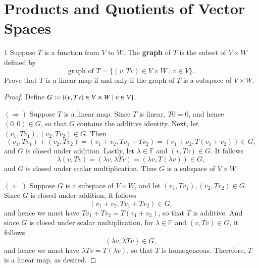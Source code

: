 \documentclass[11pt]{extarticle}
\newenvironment{problem}[1]{\begin{prob*}{#1}{}}{\end{prob*}}
\newcommand{\F}{\mathbb{F}}
\newcommand{\defeq}{\vcentcolon=}
\begin{document}
\section{Products and Quotients of Vector Spaces}

\begin{problem}{1}
Suppose $T$ is a function from $V$ to $W$.  The \textbf{graph} of $T$ is the subset of $V\times W$ defined by
\begin{equation*}
\text{graph of }T=\{(v,Tv)\in V\times W\mid v\in V\}. 
\end{equation*}
Prove that $T$ is a linear map if and only if the graph of $T$ is a subspace of $V\times W$.  
\end{problem}
\begin{proof}
Define $G \defeq \{(v, Tv)\in V\times W \mid v\in V\}$.
\par $(\Rightarrow)$ Suppose $T$ is a linear map.  Since $T$ is linear, $T0 =0$, and hence $(0, 0)\in G$, so that $G$ contains the additive identity.  Next, let $(v_1, Tv_1),(v_2,Tv_2)\in G$.  Then
\begin{equation*}
(v_1, Tv_1) + (v_2,Tv_2) = (v_1 + v_2, Tv_1 + Tv_2) = (v_1 + v_2, T(v_1 + v_2))\in G,
\end{equation*} 
and $G$ is closed under addition.  Lastly, let $\lambda\in\F$ and $(v, Tv)\in G$.  It follows
\begin{equation*}
\lambda(v, Tv) = (\lambda v, \lambda Tv) = (\lambda v, T(\lambda v))\in G,
\end{equation*}
and $G$ is closed under scalar multiplication.  Thus $G$ is a subspace of $V\times W$.  
\par $(\Leftarrow)$ Suppose $G$ is a subspace of $V\times W$, and let $(v_1, Tv_1),(v_2, Tv_2)\in G$.  Since $G$ is closed under addition, it follows
\begin{equation*}
(v_1 + v_2, Tv_1 + Tv_2)\in G,
\end{equation*}
and hence we must have $Tv_1 + Tv_2 = T(v_1 + v_2)$, so that $T$ is additive.  And since $G$ is closed under scalar multiplication, for $\lambda\in \F$ and $(v, Tv)\in G$, it follows
\begin{equation*}
(\lambda v, \lambda Tv)\in G,
\end{equation*}
and hence we must have $\lambda Tv = T(\lambda v)$, so that $T$ is homogeneous.  Therefore, $T$ is a linear map, as desired.
\end{proof}
\end{document}
